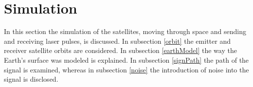 \section{Simulation}
\label{simIntro}
In this section the simulation of the satellites, moving through space and sending and receiving laser pulses, is discussed. In subsection \ref{orbit} the emitter and receiver satellite orbits are considered. In subsection \ref{earthModel} the way the Earth's surface was modeled is explained. In subsection \ref{signPath} the path of the signal is examined, whereas in subsection \ref{noise} the introduction of noise into the signal is disclosed.